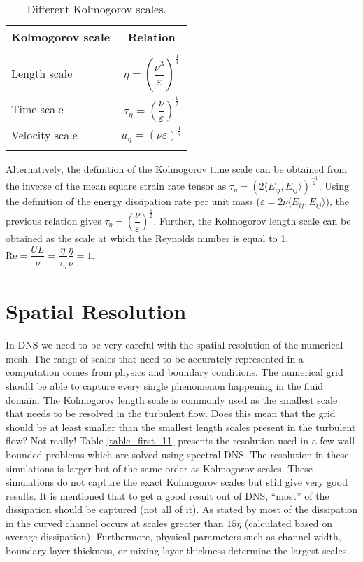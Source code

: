 \documentclass[12pt,oneside,a4paper,english]{article}
\begin{document}
\begin{table}[ht]
    \centering
    \caption{Different Kolmogorov scales.}
    \label{table_kol_scale_1}
    \begin{tabular}{lc}
    \hline
    Kolmogorov scale & Relation \\
    \hline  \hline \\[-10pt]
     Length scale & $\eta = \left(\dfrac{\nu^3}{\varepsilon}\right)^{\frac{1}{4}}$ \\[10pt]
     Time scale & $\tau_{\eta} = \left(\dfrac{\nu}{\varepsilon}\right)^{\frac{1}{2}}$  \\[10pt]
     Velocity scale & $u_{\eta} = \left(\nu \varepsilon\right)^{\frac{1}{4}}$ \\[10pt]
    \hline \\
\end{tabular}
\end{table}

Alternatively, the definition of the Kolmogorov time scale can be obtained from the inverse of the mean square strain rate tensor as $\tau _{\eta}=(2\langle E_{ij}, E_{ij}\rangle)^{\frac{-1}{2}}$. Using the definition of the energy dissipation rate per unit mass ($\varepsilon =2\nu \langle E_{ij}, E_{ij}\rangle$), the previous relation gives $\tau _{\eta}=(\dfrac{\nu}{\varepsilon})^{\frac{1}{2}}$. Further, the Kolmogorov length scale can be obtained as the scale at which the Reynolds number is equal to 1, $\text{Re}=\dfrac{UL}{\nu}=\dfrac{\eta }{\tau _{\eta }}\dfrac{\eta }{\nu} =1$.







\section{Spatial Resolution}
In DNS we need to be very careful with the spatial resolution of the numerical mesh. The range of scales that need to be accurately represented in a computation comes from physics and boundary conditions. The numerical grid should be able to capture every single phenomenon happening in the fluid domain. The Kolmogorov length scale is commonly used as the smallest scale that needs to be resolved in the turbulent flow. Does this mean that the grid should be at least smaller than the smallest length scales present in the turbulent flow? Not really! Table \ref{table_first_11} presents the resolution used in a few wall-bounded problems which are solved using spectral DNS. The resolution in these simulations is larger but of the same order as Kolmogorov scales. These simulations do not capture the exact Kolmogorov scales but still give very good results. It is mentioned that to get a good result out of DNS, ``most'' of the dissipation should be captured (not all of it). As stated by \cite{Kardashian1998} most of the dissipation in the curved channel occurs at scales greater than $15\eta$ (calculated based on average dissipation). Furthermore, physical parameters such as channel width, boundary layer thickness, or mixing layer thickness determine the largest scales.
\end{document}
